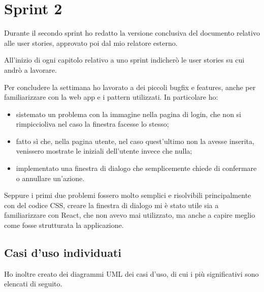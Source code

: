 
\section{Sprint 2}
\label{sec:sprint2}

Durante il secondo sprint ho redatto la versione conclusiva del documento relativo alle user stories, approvato poi dal mio relatore esterno.

\noindent All'inizio di ogni capitolo relativo a uno sprint indicherò le user stories su cui andrò a lavorare.

Per concludere la settimana ho lavorato a dei piccoli bugfix e features, anche per familiarizzare con la web app e i pattern utilizzati.
In particolare ho: 
\begin{itemize}
  \item sistemato un problema con la immagine nella pagina di login, che non si rimpiccioliva nel caso la finestra facesse lo stesso;
  \item fatto sì che, nella pagina utente, nel caso quest'ultimo non la avesse inserita, venissero mostrate le iniziali dell'utente invece che nulla;
  \item implementato una finestra di dialogo che semplicemente chiede di confermare o annullare un'azione.
\end{itemize}

Seppure i primi due problemi fossero molto semplici e risolvibili principalmente con del codice CSS, creare la finestra di dialogo mi è stato utile sia a familiarizzare con React, che non avevo mai utilizzato, ma anche a capire meglio come fosse strutturata la applicazione.\\

\subsection{Casi d'uso individuati}
Ho inoltre creato dei diagrammi UML dei casi d'uso, di cui i più significativi sono elencati di seguito.

